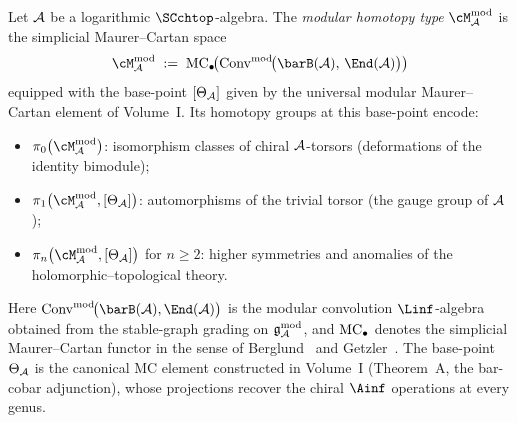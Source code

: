 \begin{definition}
\label{def:modular-homotopy-type}
Let $\mathcal{A}$ be a logarithmic $\SCchtop$-algebra.
The \emph{modular homotopy type} $\cM^{\mathrm{mod}}_\cA$ is the
simplicial Maurer--Cartan space
\begin{equation}\label{eq:modular-homotopy-type}
\cM^{\mathrm{mod}}_\cA
\;:=\;
\MC_\bullet\!\bigl(
 \Conv^{\mathrm{mod}}\!\bigl(\barB(\cA),\, \End(\cA)\bigr)
\bigr)
\end{equation}
equipped with the base-point $[\Theta_{\mathcal{A}}]$ given by the
universal modular Maurer--Cartan element of Volume~I. Its
homotopy groups at this base-point encode:
\begin{itemize}[leftmargin=1.8em]
\item $\pi_0\bigl(\cM^{\mathrm{mod}}_\cA\bigr)$: isomorphism
 classes of chiral $\mathcal{A}$-torsors (deformations of the identity
 bimodule);
\item $\pi_1\bigl(\cM^{\mathrm{mod}}_\cA, [\Theta_\cA]\bigr)$:
 automorphisms of the trivial torsor (the gauge group of $\mathcal{A}$);
\item $\pi_n\bigl(\cM^{\mathrm{mod}}_\cA, [\Theta_\cA]\bigr)$
 for $n\ge 2$: higher symmetries and anomalies of the
 holomorphic--topological theory.
\end{itemize}
\end{definition}

\noindent
Here $\Conv^{\mathrm{mod}}\!\bigl(\barB(\cA),\End(\cA)\bigr)$
is the modular convolution $\Linf$-algebra obtained from the
stable-graph grading on $\mathfrak{g}^{\mathrm{mod}}_{\mathcal{A}}$, and $\operatorname{MC}_\bullet$ denotes the
simplicial Maurer--Cartan functor in the sense of
Berglund~\cite{Berglund15} and Getzler~\cite{Getzler09}. The
base-point $\Theta_{\mathcal{A}}$ is the canonical MC element constructed in
Volume~I (Theorem~A, the bar-cobar adjunction), whose projections recover
the chiral $\Ainf$ operations at every genus.

